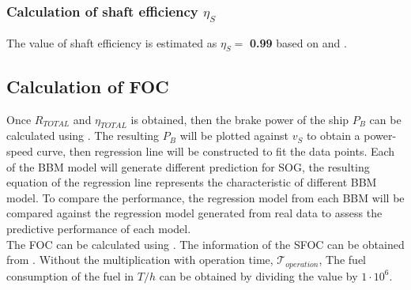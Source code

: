 \subsubsection*{Calculation of shaft efficiency $\eta_S$}

The value of shaft efficiency is estimated as $\eta_S =$ \textbf{0.99} based on  and .

\subsection{Calculation of FOC}\label{sec:FOC_calc_method}

Once $R_{TOTAL}$ and $\eta_{TOTAL}$ is obtained, then the brake power of the ship $P_B$ can be calculated using . The resulting $P_B$ will be plotted against $v_S$ to obtain a power-speed curve, then regression line will be constructed to fit the data points. Each of the BBM model will generate different prediction for SOG, the resulting equation of the regression line represents the characteristic of different BBM model. To compare the performance, the regression model from each BBM will be compared against the regression model generated from real data to assess the predictive performance of each model.\\

The FOC can be calculated using . The information of the SFOC can be obtained from . Without the multiplication with operation time, $\mathcal{T}_{operation}$, The fuel consumption of the fuel in $T/h$ can be obtained by dividing the value by \textbf{$1 \cdot 10^6$}.\\  


